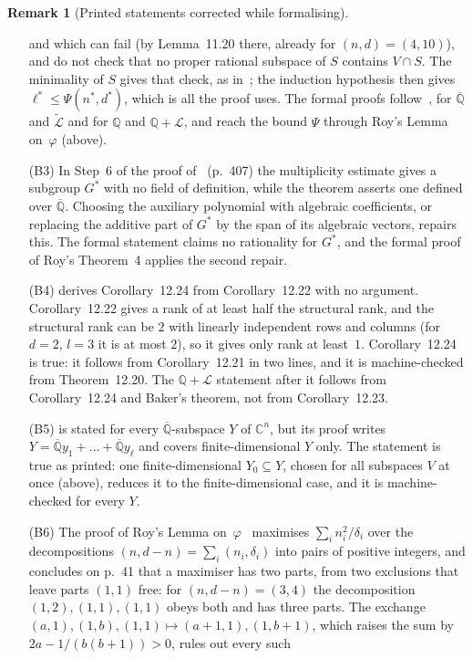 \documentclass[11pt,a4paper]{article}
\theoremstyle{plain}
\theoremstyle{definition}
\newtheorem{remark}[theorem]{Remark}
\newcommand{\C}{\mathbb{C}}
\newcommand{\Q}{\mathbb{Q}}
\newcommand{\Alg}{\overline{\mathbb{Q}}}
\newcommand{\Logs}{\mathcal{L}}
\newcommand{\aLogs}{\widetilde{\mathcal{L}}}
\begin{document}
\begin{remark}[Printed statements corrected while formalising]
\begin{itemize}
and which can fail (by Lemma~11.20 there, already for $(n,d)=(4,10)$), and do not check that no proper rational
subspace of $S$ contains $V\cap S$. The minimality of $S$ gives that check, as in~\cite[p.~39]{roy-1992}; the
induction hypothesis then gives $\ell^{*}\leq\Psi(n^{*},d^{*})$, which is all the proof uses. The formal proofs
follow~\cite[Theorem~5]{roy-1992}, for $\Alg$ and $\aLogs$ and for $\Q$ and $\Q+\Logs$, and reach the bound $\Psi$
through Roy's Lemma on~$\varphi$ (above).
\item[(B3)] In Step~6 of the proof of~\cite[Theorem~11.21]{waldschmidt-book} (p.~407) the multiplicity estimate
gives a subgroup $G^{*}$ with no field of definition, while the theorem asserts one defined over $\Alg$. Choosing
the auxiliary polynomial with algebraic coefficients, or replacing the additive part of $G^{*}$ by the span of its
algebraic vectors, repairs this. The formal statement claims no rationality for $G^{*}$, and the formal proof of
Roy's Theorem~4 applies the second repair.
\item[(B4)] \cite[p.~436]{waldschmidt-book} derives Corollary~12.24 from Corollary~12.22 with no argument. Corollary~12.22
gives a rank of at least half the structural rank, and the structural rank can be $2$ with linearly independent
rows and columns (for $d=2$, $l=3$ it is at most $2$), so it gives only rank at least~$1$. Corollary~12.24 is true:
it follows from Corollary~12.21 in two lines, and it is machine-checked from Theorem~12.20. The $\Q+\Logs$
statement after it follows from Corollary~12.24 and Baker's theorem, not from Corollary~12.23.
\item[(B5)] \cite[Theorem~2.1]{waldschmidt-2005b} is stated for every $\Alg$-subspace $Y$ of $\C^{n}$, but its proof
writes $Y=\Alg y_{1}+\dots+\Alg y_{\ell}$ and covers finite-dimensional $Y$ only. The statement is true as
printed: one finite-dimensional $Y_{0}\subseteq Y$, chosen for all subspaces $V$ at once (above), reduces it to the
finite-dimensional case, and it is machine-checked for every $Y$.
\item[(B6)] The proof of Roy's Lemma on~$\varphi$~\cite[p.~40]{roy-1992} maximises $\sum_{i}n_{i}^{2}/\delta_{i}$
over the decompositions $(n,d-n)=\sum_{i}(n_{i},\delta_{i})$ into pairs of positive integers, and concludes on p.~41
that a maximiser has two parts, from two exclusions that leave parts $(1,1)$ free: for $(n,d-n)=(3,4)$ the
decomposition $(1,2),(1,1),(1,1)$ obeys both and has three parts. The exchange
$(a,1),(1,b),(1,1)\mapsto(a+1,1),(1,b+1)$, which raises the sum by $2a-1/(b(b+1))>0$, rules out every such

\end{itemize}
\end{remark}
\end{document}
